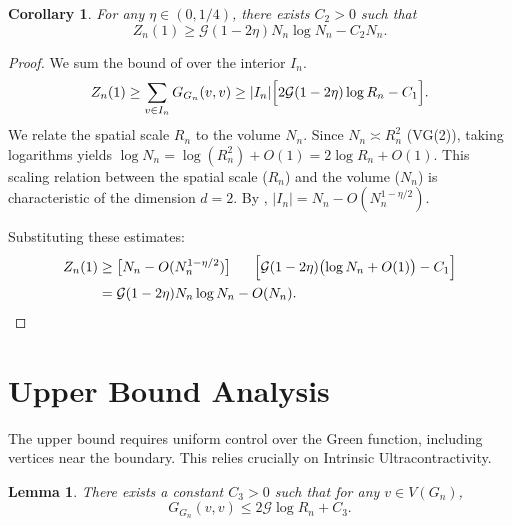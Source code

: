 \documentclass[12pt]{amsart}
\newtheorem{lemma}[theorem]{Lemma}
\newtheorem{corollary}[theorem]{Corollary}
\theoremstyle{definition}
\theoremstyle{remark}
\newcommand{\cG}{\mathcal{G}}    %
\begin{document}
\begin{corollary}\label{cor:lower}
For any $\eta \in (0,1/4)$, there exists $C_2 > 0$ such that
\[
Z_n(1) \geq \cG(1-2\eta) N_n \log N_n - C_2 N_n.
\]
\end{corollary}

\begin{proof}
We sum the bound of  over the interior $I_n$.
\[
Z_n(1) \geq \sum_{v \in I_n} G_{G_n}(v,v) \geq |I_n|\Bigl[2\cG(1-2\eta)\log R_n - C_1\Bigr].
\]
We relate the spatial scale $R_n$ to the volume $N_n$. Since $N_n \asymp R_n^2$ (VG(2)), taking logarithms yields $\log N_n = \log(R_n^2) + O(1) = 2\log R_n + O(1)$. This scaling relation between the spatial scale ($R_n$) and the volume ($N_n$) is characteristic of the dimension $d=2$. By , $|I_n| = N_n - O(N_n^{1-\eta/2})$.

Substituting these estimates:
\begin{align*}
Z_n(1) &\ge \bigl[N_n - O(N_n^{1-\eta/2})\bigr]
         \Bigl[\cG(1-2\eta)\bigl(\log N_n + O(1)\bigr) - C_1\Bigr] \\
&= \cG(1-2\eta) N_n \log N_n - O(N_n).\qedhere
\end{align*}
\end{proof}

\section{Upper Bound Analysis}\label{sec:upper_bound}

The upper bound requires uniform control over the Green function, including vertices near the boundary. This relies crucially on Intrinsic Ultracontractivity.

\begin{lemma}\label{lem:upper}
There exists a constant $C_3 > 0$ such that for any $v \in V(G_n)$,
\[
G_{G_n}(v,v) \leq 2\cG \log R_n + C_3.
\]
\end{lemma}
\end{document}
